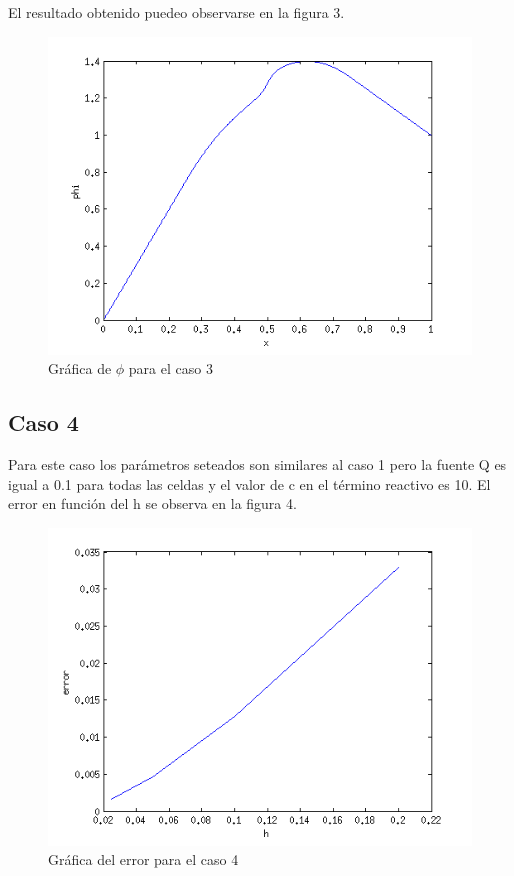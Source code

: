\documentclass[11pt]{article}
\begin{document}
El resultado obtenido puedeo observarse en la figura 3.


\begin{figure}[tbh]
	\centering
		\includegraphics[width=1.0\textwidth]{imagen3.png}
	\caption{Gr\'afica de $\phi$ para el caso 3}
	\label{fig:Fig1}
\end{figure}

\bigskip 
\subsection{Caso 4}

Para este caso los par\'ametros seteados son similares al caso 1 pero la fuente Q es igual a 0.1 para todas las celdas y el valor de c en el t\'ermino reactivo es 10. El error en funci\'on del h se observa en la figura 4.

\begin{figure}[tbh]
	\centering
		\includegraphics[width=1.0\textwidth]{imagen4.png}
	\caption{Gr\'afica del error para el caso 4}
	\label{fig:Fig1}
\end{figure}
\end{document}
